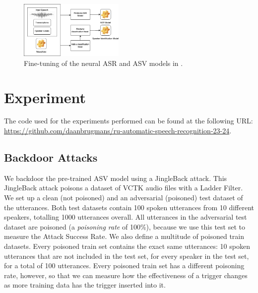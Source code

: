 \documentclass[11pt]{article}
\begin{document}
\begin{figure}
  \centering
  \includegraphics[width=0.45\textwidth]{roddeman_etal_models.png}
  \caption{Fine-tuning of the neural ASR and ASV models in \citet{roddeman2024anonymization}.}
  \label{fig:roddeman_etal_models}
\end{figure}

\section{Experiment}


The code used for the experiments performed can be found at the following URL: \url{https://github.com/daanbrugmans/ru-automatic-speech-recognition-23-24}.

\subsection{Backdoor Attacks}
We backdoor the pre-trained ASV model using a JingleBack attack.
This JingleBack attack poisons a dataset of VCTK audio files with a Ladder Filter.
We set up a clean (not poisoned) and an adversarial (poisoned) test dataset of the utterances.
Both test datasets contain 100 spoken utterances from 10 different speakers, totalling 1000 utterances overall.
All utterances in the adversarial test dataset are poisoned (a \textit{poisoning rate} of 100\%), because we use this test set to measure the Attack Success Rate.
We also define a multitude of poisoned train datasets.
Every poisoned train set contains the exact same utterances: 10 spoken utterances that are not included in the test set, for every speaker in the test set, for a total of 100 utterances.
Every poisoned train set has a different poisoning rate, however, so that we can measure how the effectiveness of a trigger changes as more training data has the trigger inserted into it.
\end{document}
